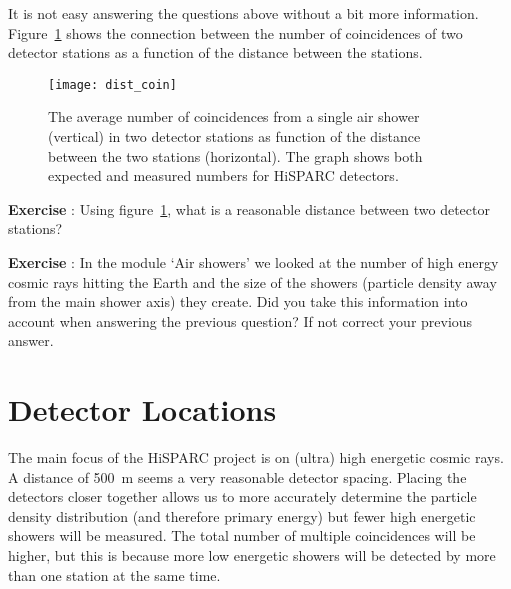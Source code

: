 It is not easy answering the questions above without a bit more information. Figure~\ref{fig:dist_coin} shows the connection between the number of coincidences of two detector stations as a function of the distance between the stations.

\begin{figure}\begin{center}
\texttt{[image: dist\_coin]}
\caption{The average number of coincidences from a single air shower (vertical) in two detector stations as function of the distance between the two stations (horizontal). The graph shows both expected and measured numbers for HiSPARC detectors.\protect\footnotemark }\label{fig:dist_coin}
\end{center}\end{figure}

\begin{shaded}
\textbf{Exercise \theExercise {}} : Using figure~\ref{fig:dist_coin}, what is a reasonable distance between two detector stations? \end{shaded}

\begin{shaded}
\textbf{Exercise \theExercise {}} : In the module `Air showers' we looked at the number of high energy cosmic rays hitting the Earth and the size of the showers (particle density away from the main shower axis) they create. Did you take this information into account when answering the previous question? If not correct your previous answer.
\end{shaded}

\section{Detector Locations}
The main focus of the HiSPARC project is on (ultra) high energetic cosmic rays.  A distance of 500~m seems a very reasonable detector spacing. Placing the detectors closer together allows us to more accurately determine the particle density distribution (and therefore primary energy) but fewer high energetic showers will be measured. The total number of multiple coincidences will be higher, but this is because more low energetic showers will be detected by more than one station at the same time.

